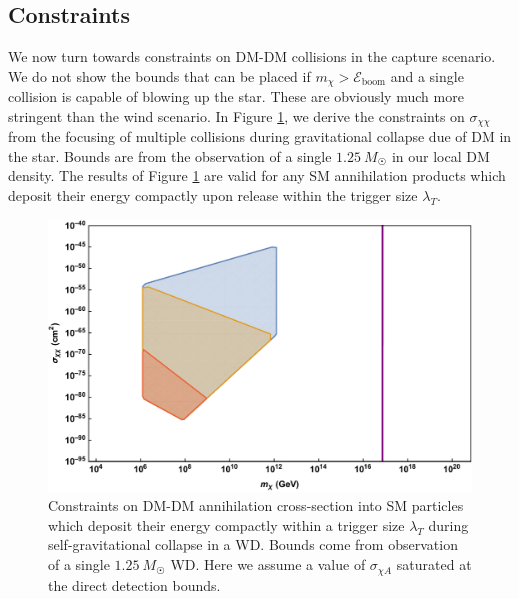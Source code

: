 \documentclass[preprintnumbers,amsmath,amssymb,prd,superscriptaddress]{revtex4}
\newcommand{\Eboom}{\mathcal{E}_\text{boom}}
\begin{document}
\subsection{Constraints}
We now turn towards constraints on DM-DM collisions in the capture scenario.
We do not show the bounds that can be placed if $m_\chi > \Eboom$ and a single collision is capable of blowing up the star. 
These are obviously much more stringent than the wind scenario. 
In Figure \ref{fig:multicapture}, we derive the constraints on $\sigma_{\chi \chi}$ from the focusing of multiple collisions during gravitational collapse due of DM in the star.
Bounds are from the observation of a single $1.25 ~ M_{\astrosun}$ in our local DM density. 
The results of Figure \ref{fig:multicapture} are valid for any SM annihilation products which deposit their energy compactly upon release within the trigger size $\lambda_T$.
\begin{figure}
\includegraphics[scale=.35]{multicollision.pdf}
\caption{Constraints on DM-DM annihilation cross-section into SM particles which deposit their energy compactly within a trigger size $\lambda_T$ during self-gravitational collapse in a WD. Bounds come from observation of a single $1.25~M_{\astrosun}$ WD. Here we assume a value of $\sigma_{\chi A}$ saturated at the direct detection bounds.}
\label{fig:multicapture}
\end{figure}
\end{document}
